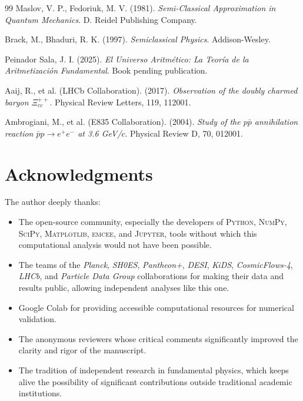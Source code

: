 \documentclass[11pt, a4paper]{article}
\theoremstyle{plain}
\theoremstyle{definition}
\begin{document}
\begin{thebibliography}{99}
Maslov, V. P., Fedoriuk, M. V. (1981). \textit{Semi-Classical Approximation in Quantum Mechanics}. D. Reidel Publishing Company.

Brack, M., Bhaduri, R. K. (1997). \textit{Semiclassical Physics}. Addison-Wesley.

Peinador Sala, J. I. (2025). \textit{El Universo Aritmético: La Teoría de la Aritmetización Fundamental}. Book pending publication.


Aaij, R., et al. (LHCb Collaboration). (2017). \textit{Observation of the doubly charmed baryon $\Xi_{cc}^{++}$}. Physical Review Letters, 119, 112001.

Ambrogiani, M., et al. (E835 Collaboration). (2004). \textit{Study of the $p\bar{p}$ annihilation reaction $\bar{p}p \to e^+e^-$ at 3.6 GeV/$c$}. Physical Review D, 70, 012001.

\end{thebibliography}


\section*{Acknowledgments}

The author deeply thanks:

\begin{itemize}
    \item The open-source community, especially the developers of \textsc{Python}, \textsc{NumPy}, \textsc{SciPy}, \textsc{Matplotlib}, \textsc{emcee}, and \textsc{Jupyter}, tools without which this computational analysis would not have been possible.
    
    \item The teams of the \textit{Planck}, \textit{SH0ES}, \textit{Pantheon+}, \textit{DESI}, \textit{KiDS}, \textit{CosmicFlows-4}, \textit{LHCb}, and \textit{Particle Data Group} collaborations for making their data and results public, allowing independent analyses like this one.
    
    \item Google Colab for providing accessible computational resources for numerical validation.
    
    \item The anonymous reviewers whose critical comments significantly improved the clarity and rigor of the manuscript.
    
    \item The tradition of independent research in fundamental physics, which keeps alive the possibility of significant contributions outside traditional academic institutions.
\end{itemize}
\end{document}
